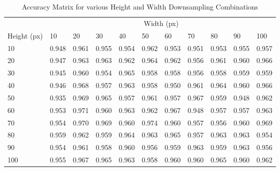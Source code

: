 \begin{table}[h]

    \begin{tabularx}{\textwidth}{ lXXXXXXXXXX }
    \toprule
    & \multicolumn{10}{c}{Width (px)} \\
    \cmidrule{2-11}
    Height (px) & 10   & 20   & 30   & 40   & 50   & 60   & 70   & 80   & 90   & 100  \\
    \midrule
    10          & 0.948 & 0.961 & 0.955 & 0.954 & 0.962 & 0.953 & 0.951 & 0.953 & 0.955 & 0.957 \\
    20          & 0.947 & 0.963 & 0.963 & 0.962 & 0.964 & 0.962 & 0.956 & 0.961 & 0.960 & 0.966 \\
    30          & 0.945 & 0.960 & 0.954 & 0.965 & 0.958 & 0.958 & 0.956 & 0.958 & 0.959 & 0.959 \\
    40          & 0.946 & 0.968 & 0.957 & 0.963 & 0.958 & 0.950 & 0.961 & 0.964 & 0.960 & 0.966 \\
    50          & 0.935 & 0.969 & 0.965 & 0.957 & 0.961 & 0.957 & 0.967 & 0.959 & 0.948 & 0.962 \\
    60          & 0.953 & 0.971 & 0.960 & 0.963 & 0.962 & 0.967 & 0.948 & 0.957 & 0.957 & 0.963 \\
    70          & 0.954 & 0.970 & 0.969 & 0.960 & 0.974 & 0.960 & 0.957 & 0.956 & 0.960 & 0.969 \\
    80          & 0.959 & 0.962 & 0.959 & 0.964 & 0.963 & 0.965 & 0.957 & 0.963 & 0.963 & 0.954 \\
    90          & 0.954 & 0.961 & 0.958 & 0.960 & 0.956 & 0.959 & 0.963 & 0.959 & 0.963 & 0.956 \\
    100         & 0.955 & 0.967 & 0.965 & 0.963 & 0.958 & 0.960 & 0.960 & 0.965 & 0.960 & 0.962 \\
    \bottomrule
    \end{tabularx}

    \label{table:height-width-matrix}
    \caption{Accuracy Matrix for various Height and Width Downsampling Combinations}
\end{table}
